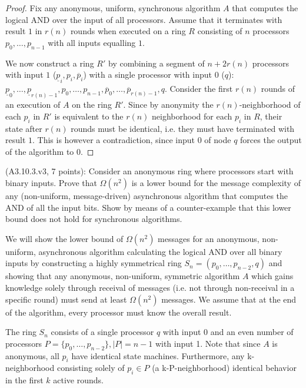 \begin{proof}
Fix any anonymous, uniform, synchronous algorithm $A$ that computes the logical AND over the input of
all processors. Assume that it terminates with result $1$ in $r(n)$ rounds when executed on a ring $R$ consisting
of $n$ processors $p_0, \ldots, p_{n-1}$ with all inputs equalling $1$.

We now construct a ring $R'$ by combining a segment of $n + 2r(n)$ processors with input $1$
($\underline{p}_i, p_i, \overline{p}_i$) with a single processor with input $0$ ($q$):
$\underline{p}_0, \ldots, \underline{p}_{r(n) - 1},
 p_0, \ldots, p_{n-1},
 \overline{p}_0, \ldots, \overline{p}_{r(n) - 1},
 q.$
Consider the first $r(n)$ rounds of an execution of $A$ on the ring $R'$. Since by anonymity
the $r(n)$-neighborhood
of each $p_i$ in $R'$ is equivalent to the $r(n)$ neighborhood for each $p_i$ in $R$, their state
after $r(n)$ rounds must be identical, i.e. they must have terminated with result $1$. This is however
a contradiction, since input $0$ of node $q$ forces the output of the algorithm to $0$.
\end{proof}


\begin{Exc}{(A3.10.3.v3, 7 points):}
Consider an anonymous ring where processors start with binary
inputs. Prove that $\Omega(n^2)$ is a lower bound for the
message complexity of any (non-uniform, message-driven)
asynchronous algorithm that computes the AND of all the
input bits. Show by means of a counter-example that this
lower bound does not hold for synchronous algorithms.
\end{Exc}

We will show the lower bound of $\Omega(n^2)$ messages for an anonymous, non-uniform,
asynchronous algorithm calculating the logical AND over all binary inputs by
constructing a highly symmetrical ring $S_n = (p_0, \ldots, p_{n-2}, q)$ and showing
that any anonymous, non-uniform, symmetric algorithm $A$ which gains knowledge solely
through receival of messages (i.e. not through non-receival in a specific round)
must send at least $\Omega(n^2)$ messages.
We assume
that at the end of the algorithm, every processor must know the overall result.

The ring $S_n$ consists of a single processor $q$ with input 0 and an even number of processors 
$P = \{ p_0, \ldots, p_{n-2} \}, |P| = n - 1$ with input 1. Note that since $A$ is anonymous, all $p_i$
have identical state machines. Furthermore, any k-neighborhood consisting solely
of $p_i \in P$ (a k-P-neighborhood) identical behavior in the first $k$ active rounds.

